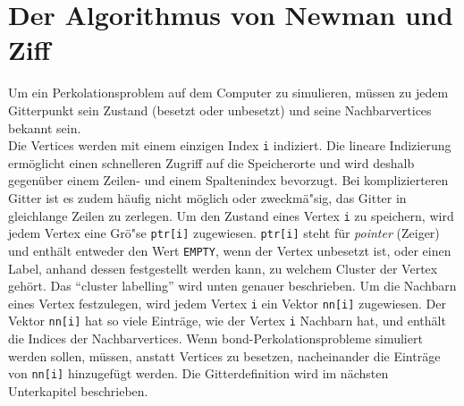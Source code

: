 \section{Der Algorithmus von Newman und Ziff \cite{Newman:01}}
Um ein Perkolationsproblem auf dem Computer zu simulieren, m\"ussen zu jedem Gitterpunkt sein Zustand (besetzt oder unbesetzt) und seine Nachbarvertices bekannt sein. \\
Die Vertices werden mit einem einzigen Index \texttt{i} indiziert. Die lineare Indizierung erm\"oglicht einen schnelleren Zugriff auf die Speicherorte und wird deshalb gegen\"uber einem Zeilen- und einem Spaltenindex bevorzugt. Bei komplizierteren Gitter ist es zudem h\"aufig  nicht m\"oglich oder zweckm\"a"sig, das Gitter in gleichlange Zeilen zu zerlegen. Um den Zustand eines Vertex \texttt{i} zu speichern, wird jedem Vertex eine Gr\"o"se \texttt{ptr[i]} zugewiesen. \texttt{ptr[i]} steht f\"ur \textit{pointer} (Zeiger) und enth\"alt entweder den Wert \texttt{EMPTY}, wenn der Vertex unbesetzt ist, oder einen Label, anhand dessen festgestellt werden kann, zu welchem Cluster der Vertex geh\"ort. Das ``cluster labelling'' wird unten genauer beschrieben. Um die Nachbarn eines Vertex festzulegen, wird jedem Vertex \texttt{i} ein Vektor \texttt{nn[i]} zugewiesen. Der Vektor \texttt{nn[i]} hat so viele Eintr\"age, wie der Vertex \texttt{i} Nachbarn hat, und enth\"alt die Indices der Nachbarvertices. Wenn bond-Perkolationsprobleme simuliert werden sollen, m\"ussen, anstatt Vertices zu besetzen, nacheinander die Eintr\"age von \texttt{nn[i]} hinzugef\"ugt werden. Die Gitterdefinition wird im n\"achsten Unterkapitel beschrieben.\\

